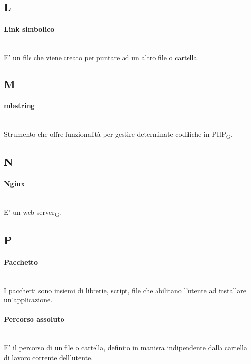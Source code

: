 \newpage
{}
\subsection*{L}
\paragraph{Link simbolico}~\smallskip \\
E' un file che viene creato per puntare ad un altro file o cartella.

\newpage
{}
\subsection*{M}
\paragraph{mbstring}~\smallskip \\
Strumento che offre funzionalità per gestire determinate codifiche in PHP\textsubscript{G}. 

\newpage
{}
\subsection*{N}
\paragraph{Nginx}~\smallskip \\
E' un web server\textsubscript{G}.

\newpage
{}
\subsection*{P}
\paragraph{Pacchetto}~\smallskip \\
I pacchetti sono insiemi di librerie, script, file che abilitano l'utente ad installare un'applicazione.

\paragraph{Percorso assoluto}~\smallskip \\
E' il percorso di un file o cartella, definito in maniera indipendente dalla cartella di lavoro corrente dell'utente.

